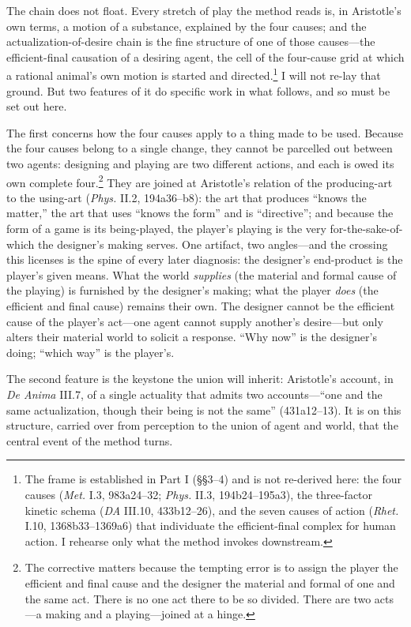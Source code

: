 \documentclass{article}
\begin{document}
The chain does not float. Every stretch of play the method reads is, in Aristotle's own terms, a motion of a substance, explained by the four causes; and the actualization-of-desire chain is the fine structure of one of those causes---the efficient-final causation of a desiring agent, the cell of the four-cause grid at which a rational animal's own motion is started and directed.\footnote{The frame is established in Part I (\S\S3--4) and is not re-derived here: the four causes (\textit{Met.} I.3, 983a24--32; \textit{Phys.} II.3, 194b24--195a3), the three-factor kinetic schema (\textit{DA} III.10, 433b12--26), and the seven causes of action (\textit{Rhet.} I.10, 1368b33--1369a6) that individuate the efficient-final complex for human action. I rehearse only what the method invokes downstream.} I will not re-lay that ground. But two features of it do specific work in what follows, and so must be set out here.

The first concerns how the four causes apply to a thing made to be used. Because the four causes belong to a single change, they cannot be parcelled out between two agents: designing and playing are two different actions, and each is owed its own complete four.\footnote{The corrective matters because the tempting error is to assign the player the efficient and final cause and the designer the material and formal of one and the same act. There is no one act there to be so divided. There are two acts---a making and a playing---joined at a hinge.} They are joined at Aristotle's relation of the producing-art to the using-art (\textit{Phys.} II.2, 194a36--b8): the art that produces ``knows the matter,'' the art that uses ``knows the form'' and is ``directive''; and because the form of a game is its being-played, the player's playing is the very for-the-sake-of-which the designer's making serves. One artifact, two angles---and the crossing this licenses is the spine of every later diagnosis: the designer's end-product is the player's given means. What the world \textit{supplies} (the material and formal cause of the playing) is furnished by the designer's making; what the player \textit{does} (the efficient and final cause) remains their own. The designer cannot be the efficient cause of the player's act---one agent cannot supply another's desire---but only alters their material world to solicit a response. ``Why now'' is the designer's doing; ``which way'' is the player's.

The second feature is the keystone the union will inherit: Aristotle's account, in \textit{De Anima} III.7, of a single actuality that admits two accounts---``one and the same actualization, though their being is not the same'' (431a12--13). It is on this structure, carried over from perception to the union of agent and world, that the central event of the method turns.
\end{document}

